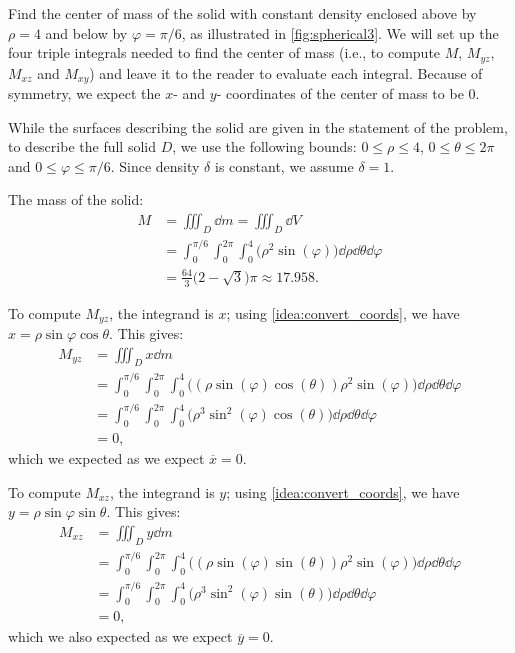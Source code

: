\begin{example}\label{ex_spherical3}%
Find the center of mass of the solid with constant density enclosed above by $\rho=4$ and below by $\varphi = \pi/6$, as illustrated in \autoref{fig:spherical3}.
\solution
We will set up the four triple integrals needed to find the center of mass (i.e., to compute $M$, $M_{yz}$, $M_{xz}$ and $M_{xy}$) and leave it to the reader to evaluate each integral. Because of symmetry, we expect the $x$- and $y$- coordinates of the center of mass to be 0.

While the surfaces describing the solid are given in the statement of the problem, to describe the full solid $D$, we use the following bounds: $0 \leq \rho \leq 4$, $0 \leq \theta \leq 2\pi$ and $0 \leq \varphi \leq \pi/6$. Since density $\delta$ is constant, we assume $\delta =1$.

The mass of the solid:
\begin{align*}
M &= \iiint_D\dd m = \iiint_D\dd V\\
	&= \int_0^{\pi/6}\int_0^{2\pi}\int_0^4\bigl(\rho^2\sin(\varphi)\bigr)\dd\rho\dd\theta\dd\varphi\\
	&= \frac{64}3\bigl(2-\sqrt{3}\bigr)\pi \approx 17.958.
\end{align*}

To compute $M_{yz}$, the integrand is $x$; using \autoref{idea:convert_coords}, we have $x = \rho\sin\varphi\cos\theta$. This gives:
\begin{align*}
M_{yz} &= \iiint_D x\dd m \\
	&= \int_0^{\pi/6}\int_0^{2\pi}\int_0^4 \bigl((\rho\sin(\varphi)\cos(\theta))\rho^2\sin(\varphi)\bigr) \dd\rho\dd\theta\dd\varphi\\
	&= \int_0^{\pi/6}\int_0^{2\pi}\int_0^4 \bigl(\rho^3\sin^2(\varphi)\cos(\theta)\bigr) \dd\rho\dd\theta\dd\varphi\\
	&=0,
\end{align*}
which we expected as we expect $\overline{x} = 0$.

To compute $M_{xz}$, the integrand is $y$; using \autoref{idea:convert_coords}, we have $y = \rho\sin\varphi\sin\theta$. This gives:
\begin{align*}
M_{xz} &= \iiint_D y\dd m \\
	&= \int_0^{\pi/6}\int_0^{2\pi}\int_0^4 \bigl((\rho\sin(\varphi)\sin(\theta))\rho^2\sin(\varphi)\bigr) \dd\rho\dd\theta\dd\varphi\\
	&= \int_0^{\pi/6}\int_0^{2\pi}\int_0^4 \bigl(\rho^3\sin^2(\varphi)\sin(\theta)\bigr) \dd\rho\dd\theta\dd\varphi\\
	&=0,
\end{align*}
which we also expected as we expect $\overline{y} = 0$.


\end{example}
